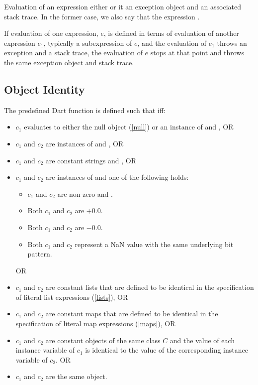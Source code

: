 \documentclass[makeidx]{article}
\begin{document}
{\LMHash{}%
Evaluation of an expression either
or it
an exception object and an associated stack trace.
In the former case, we also say that the expression
.

\LMHash{}%
If evaluation of one expression, $e$,
is defined in terms of evaluation of another expression $e_1$,
typically a subexpression of $e$,
and the evaluation of $e_1$ throws an exception and a stack trace,
the evaluation of $e$ stops at that point
and throws the same exception object and stack trace.


\subsection{Object Identity}

\LMHash{}%
The predefined Dart function  is defined such that  if{}f:
\begin{itemize}
\item $c_1$ evaluates to either the null object (\ref{null}) or an instance of  and , OR
\item $c_1$ and $c_2$ are instances of  and , OR
\item $c_1$ and $c_2$ are constant strings and , OR
\item $c_1$ and $c_2$ are instances of  and one of the following holds:
  \begin{itemize}
  \item $c_1$ and $c_2$ are non-zero and .
  \item Both $c_1$ and $c_2$ are $+0.0$.
  \item Both $c_1$ and $c_2$ are $-0.0$.
  \item Both $c_1$ and $c_2$ represent a NaN value with the same underlying bit pattern.
  \end{itemize}
 OR
\item $c_1$ and $c_2$ are constant lists that are defined to be identical in the specification of literal list expressions (\ref{lists}), OR
\item $c_1$ and $c_2$ are constant maps that are defined to be identical in the specification of literal map expressions (\ref{maps}), OR
\item $c_1$ and $c_2$ are constant objects of the same class $C$ and the value of each instance variable of $c_1$ is identical to the value of the corresponding instance variable of $c_2$. OR
\item $c_1$ and $c_2$ are the same object.
\end{itemize}

}
\end{document}
